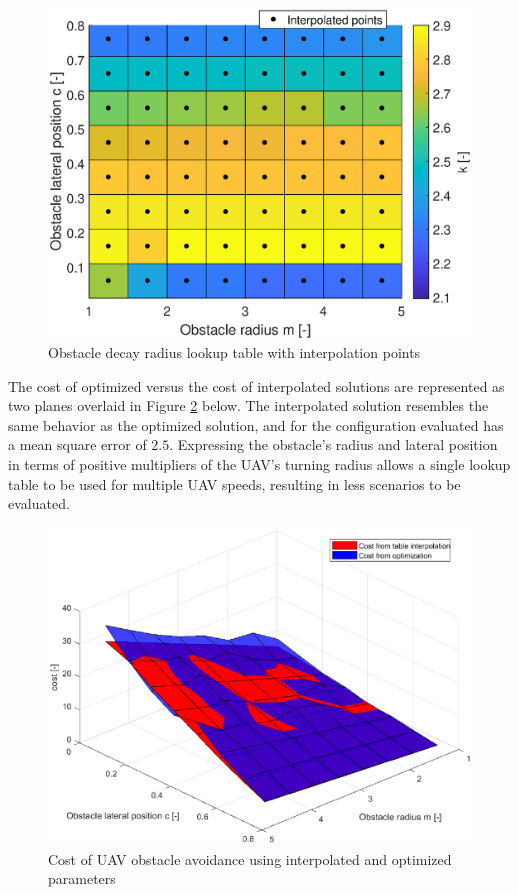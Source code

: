 \documentclass[numbered,pdftex]{ohio-etd}
\begin{document}
\begin{figure}[H]
	\centering
	\includegraphics[width=12cm]{PaperFigures/Methods/LookupTable/kTableInterpolationPoints}
	\caption{Obstacle decay radius lookup table with interpolation points}
	\label{fig:ktableInterp}
\end{figure}

The cost of optimized versus the cost of interpolated solutions are represented as two planes overlaid in Figure \ref{fig:costplanes} below. The interpolated solution resembles the same behavior as the optimized solution, and for the configuration evaluated has a mean square error of $2.5$. Expressing the obstacle's radius and lateral position in terms of positive multipliers of the UAV's turning radius allows a single lookup table to be used for multiple UAV speeds, resulting in less scenarios to be evaluated.

\begin{figure}[H]
	\centering
	\includegraphics[width=12cm]{PaperFigures/Methods/LookupTable/costPlanes}
	\caption{Cost of UAV obstacle avoidance using interpolated and optimized parameters}
	\label{fig:costplanes}
\end{figure}
\end{document}
